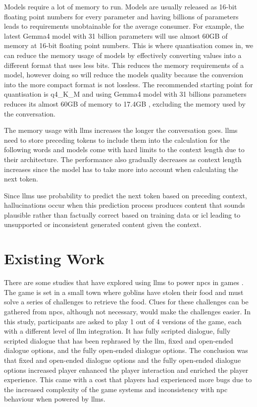 \documentclass[12pt, a4paper]{report}
\begin{document}
	Models require a lot of memory to run. Models are usually released as 16-bit floating point numbers for every parameter and having billions of parameters leads to requirements unobtainable for the average consumer. For example, the latest Gemma4 model with 31 billion parameters will use almost 60GB of memory at 16-bit floating point numbers. This is where quantisation comes in, we can reduce the memory usage of models by effectively converting values into a different format that uses less bits. This reduces the memory requirements of a model, however doing so will reduce the models quality because the conversion into the more compact format is not lossless. The recommended starting point for quantisation is q4\_K\_M and using Gemma4 model with 31 billions parameters reduces its almost 60GB of memory to 17.4GB \parencite{googleGemmaModel}, excluding the memory used by the conversation.
	
	The memory usage with \gls{llm}s increases the longer the conversation goes. \gls{llm}s need to store preceding tokens to include them into the calculation for the following words and models come with hard limits to the context length due to their architecture. The performance also gradually decreases as context length increases since the model has to take more into account when calculating the next token.
	
	Since \gls{llm}s use probability to predict the next token based on preceding context, hallucinations occur when this prediction process produces content that sounds plausible rather than factually correct based on training data or \gls{icl} leading to unsupported or inconsistent generated content given the context.
	
	\section{Existing Work}
	\label{section:existingwork}
	There are some studies that have explored using \gls{llm}s to power \gls{npc}s in games \parencite{petersen2025conversational}. The game is set in a small town where goblins have stolen their food and must solve a series of challenges to retrieve the food. Clues for these challenges can be gathered from \gls{npc}s, although not necessary, would make the challenges easier. In this study, participants are asked to play 1 out of 4 versions of the game, each with a different level of \gls{llm} integration. It has fully scripted dialogue, fully scripted dialogue that has been rephrased by the \gls{llm}, fixed and open-ended dialogue options, and the fully open-ended dialogue options. The conclusion was that fixed and open-ended dialogue options and the fully open-ended dialogue options increased player enhanced the player interaction and enriched the player experience. This came with a cost that players had experienced more bugs due to the increased complexity of the game systems and inconsistency with \gls{npc} behaviour when powered by \gls{llm}s.
		
\end{document}

